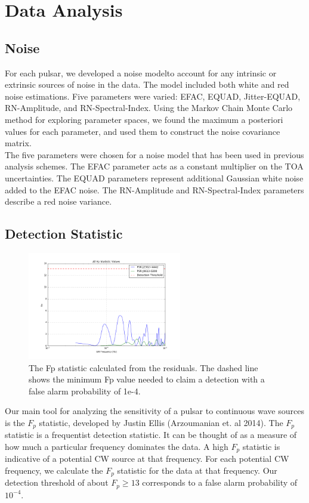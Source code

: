 \documentclass[12pt]{article}
\begin{document}
\section{Data Analysis}
\subsection{Noise}
   For each pulsar, we developed a noise modelto account for any intrinsic or
extrinsic sources of noise in the data. The model included both white and red
noise estimations. Five parameters were varied: EFAC, EQUAD, Jitter-EQUAD,
RN-Amplitude, and RN-Spectral-Index. Using the Markov Chain Monte Carlo method
for exploring parameter spaces, we found the maximum a posteriori values for
each parameter, and used them to construct the noise covariance matrix.
\\
The five parameters were chosen for a noise model that has been used in
previous analysis schemes. The EFAC parameter acts as a constant multiplier on
the TOA uncertainties. The EQUAD parameters represent additional Gaussian white
noise added to the EFAC noise. The RN-Amplitude and RN-Spectral-Index parameters
describe a red noise variance. 

\subsection{Detection Statistic}

\begin{figure}[h!]
\caption{The Fp statistic calculated from the residuals. The dashed line shows
the minimum Fp value needed to claim a detection with a false alarm probability
of 1e-4.}
\includegraphics[width=0.6\textwidth]{./figures/both_fp.png}
\end{figure}

    Our main tool for analyzing the sensitivity of a pulsar to continuous wave
sources is the $F_p$ statistic, developed by Justin Ellis (Arzoumanian et. al
2014). The
$F_p$ statistic is a frequentist detection statistic. It can be thought of as a
measure of how much a particular frequency dominates the data. A high $F_p$
statistic is indicative of a potential CW source at that frequency. For each
potential CW frequency, we calculate the $F_p$ statistic for the data at that
frequency. Our detection threshold of about $F_p \geq 13$ corresponds to a false
alarm probability of $10^{-4}$.
\end{document}
